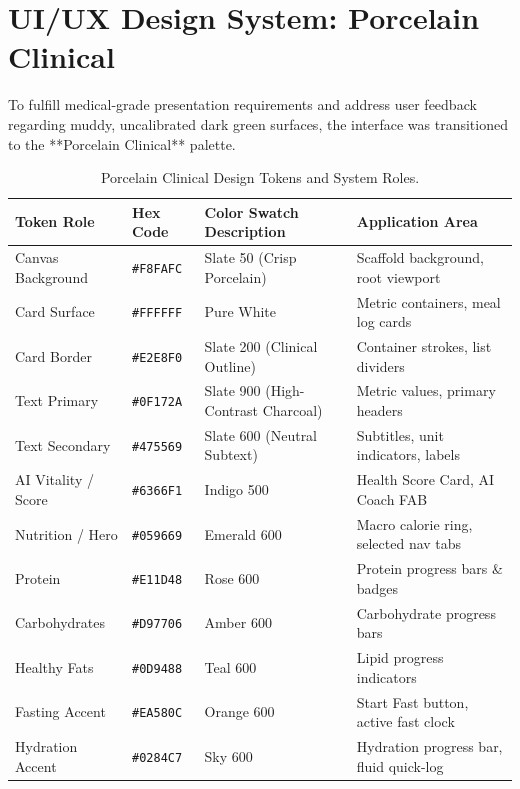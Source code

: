 \documentclass[12pt,a4paper]{article}
\begin{document}
\section{UI/UX Design System: Porcelain Clinical}
To fulfill medical-grade presentation requirements and address user feedback regarding muddy, uncalibrated dark green surfaces, the interface was transitioned to the **Porcelain Clinical** palette.

\begin{table}[H]
\centering
\small
\begin{tabularx}{\textwidth}{@{}l l p{3.8cm} X@{}}
\toprule
\textbf{Token Role} & \textbf{Hex Code} & \textbf{Color Swatch Description} & \textbf{Application Area} \\ \midrule
Canvas Background & \texttt{\#F8FAFC} & Slate 50 (Crisp Porcelain) & Scaffold background, root viewport \\
Card Surface & \texttt{\#FFFFFF} & Pure White & Metric containers, meal log cards \\
Card Border & \texttt{\#E2E8F0} & Slate 200 (Clinical Outline) & Container strokes, list dividers \\
Text Primary & \texttt{\#0F172A} & Slate 900 (High-Contrast Charcoal)& Metric values, primary headers \\
Text Secondary & \texttt{\#475569} & Slate 600 (Neutral Subtext) & Subtitles, unit indicators, labels \\
AI Vitality / Score & \texttt{\#6366F1} & Indigo 500 & Health Score Card, AI Coach FAB \\
Nutrition / Hero & \texttt{\#059669} & Emerald 600 & Macro calorie ring, selected nav tabs \\
Protein & \texttt{\#E11D48} & Rose 600 & Protein progress bars \& badges \\
Carbohydrates & \texttt{\#D97706} & Amber 600 & Carbohydrate progress bars \\
Healthy Fats & \texttt{\#0D9488} & Teal 600 & Lipid progress indicators \\
Fasting Accent & \texttt{\#EA580C} & Orange 600 & Start Fast button, active fast clock \\
Hydration Accent & \texttt{\#0284C7} & Sky 600 & Hydration progress bar, fluid quick-log \\
\bottomrule
\end{tabularx}
\caption{Porcelain Clinical Design Tokens and System Roles.}
\label{tab:colors}
\end{table}
\end{document}
